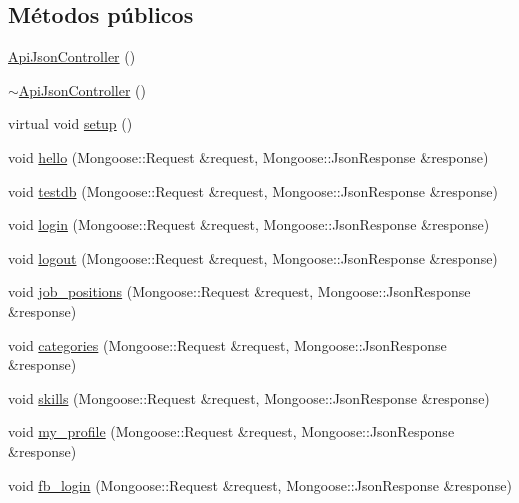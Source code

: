 \subsection*{Métodos públicos}
\begin{DoxyCompactItemize}
\item 
\hyperlink{classApiJsonController_ad5d1aff126905ea4a9cc85d481e747a0}{Api\+Json\+Controller} ()
\item 
\hyperlink{classApiJsonController_a889add94a7d9a5a5e0cb4278fa81eb47}{$\sim$\+Api\+Json\+Controller} ()
\item 
virtual void \hyperlink{classApiJsonController_a1e809af244d7c98b3033e573919921b2}{setup} ()
\item 
void \hyperlink{classApiJsonController_adef3856c8f8f6cc7f4d980c31a9c31fb}{hello} (Mongoose\+::\+Request \&request, Mongoose\+::\+Json\+Response \&response)
\item 
void \hyperlink{classApiJsonController_a51551fd5eb0a87f79f810d67353584cb}{testdb} (Mongoose\+::\+Request \&request, Mongoose\+::\+Json\+Response \&response)
\item 
void \hyperlink{classApiJsonController_a6f3831b46ccd2b684256d8475de08e50}{login} (Mongoose\+::\+Request \&request, Mongoose\+::\+Json\+Response \&response)
\item 
void \hyperlink{classApiJsonController_adc58c5ee867cd7ebd906a93c2ab66e23}{logout} (Mongoose\+::\+Request \&request, Mongoose\+::\+Json\+Response \&response)
\item 
void \hyperlink{classApiJsonController_ae31f4111016a43bf025c513ab7d7a6be}{job\+\_\+positions} (Mongoose\+::\+Request \&request, Mongoose\+::\+Json\+Response \&response)
\item 
void \hyperlink{classApiJsonController_a517f518559e86d3b5d1ce962a187694e}{categories} (Mongoose\+::\+Request \&request, Mongoose\+::\+Json\+Response \&response)
\item 
void \hyperlink{classApiJsonController_a2d2a0b94bcf49ece8444ef3b30a61189}{skills} (Mongoose\+::\+Request \&request, Mongoose\+::\+Json\+Response \&response)
\item 
void \hyperlink{classApiJsonController_aa0ae8d88ab73349b5cbebea85127e485}{my\+\_\+profile} (Mongoose\+::\+Request \&request, Mongoose\+::\+Json\+Response \&response)
\item 
void \hyperlink{classApiJsonController_a4e1c8c117457100c5297cfac507e78ef}{fb\+\_\+login} (Mongoose\+::\+Request \&request, Mongoose\+::\+Json\+Response \&response)
\item 

\end{DoxyCompactItemize}
